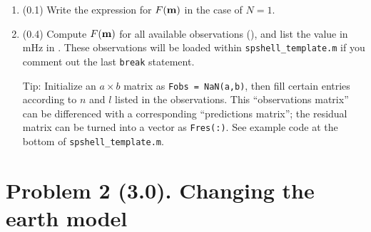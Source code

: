 \documentclass[11pt,titlepage,fleqn]{article}
\begin{document}
\begin{enumerate}
\begin{enumerate}
\item (0.1) Write the expression for $F(\mbox{${\bf m}$})$ in the case of $N=1$.

\item (0.4) Compute $F(\mbox{${\bf m}$})$ for all available observations (), and list the value in mHz in . These observations will be loaded within \verb+spshell_template.m+ if you comment out the last \verb+break+ statement.

Tip: Initialize an $a \times b$ matrix as \verb+Fobs = NaN(a,b)+, then fill certain entries according to $n$ and $l$ listed in the observations. This ``observations matrix'' can be differenced with a corresponding ``predictions matrix''; the residual matrix can be turned into a vector as \verb+Fres(:)+. See example code at the bottom of \verb+spshell_template.m+.

\end{enumerate}

\label{prob:Fm}

\end{enumerate}


\section*{Problem 2 (3.0). Changing the earth model}
\end{document}

